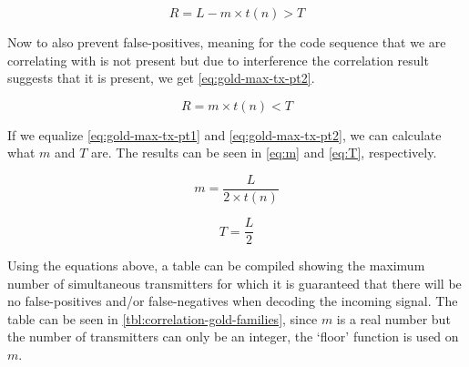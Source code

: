 \begin{equation}
	\label{eq:gold-max-tx-pt1}
	R = L - m \times t(n) > T
\end{equation}

Now to also prevent false-positives, meaning for the code sequence that we are correlating with is not present but due to interference the correlation result suggests that it is present, we get \autoref{eq:gold-max-tx-pt2}.


\begin{equation}
	\label{eq:gold-max-tx-pt2}
	R = m \times t(n) < T
\end{equation}

If we equalize \autoref{eq:gold-max-tx-pt1} and \autoref{eq:gold-max-tx-pt2}, we can calculate what $m$ and $T$ are.
The results can be seen in \autoref{eq:m} and \autoref{eq:T}, respectively.


\begin{equation}
	\label{eq:m}
	m = \frac{L}{2 \times t(n)}
\end{equation}

\begin{equation}
	\label{eq:T}
	T = \frac{L}{2}
\end{equation}


Using the equations above, a table can be compiled showing the maximum number of simultaneous transmitters for which it is guaranteed that there will be no false-positives and/or false-negatives when decoding the incoming signal.
The table can be seen in \autoref{tbl:correlation-gold-families}, since $m$ is a real number but the number of transmitters can only be an integer, the `floor' function is used on $m$. 



